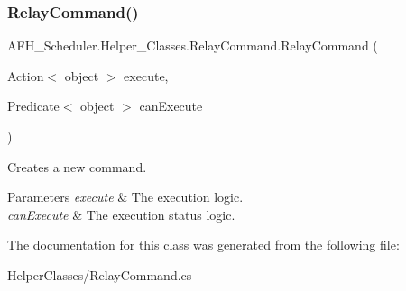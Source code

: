 \subsubsection{RelayCommand()\hspace{0.1cm}{\footnotesize\ttfamily [2/2]}}
{\footnotesize\ttfamily A\+F\+H\+\_\+\+Scheduler.\+Helper\+\_\+\+Classes.\+Relay\+Command.\+Relay\+Command (\begin{DoxyParamCaption}\item[{Action$<$ object $>$}]{execute,  }\item[{Predicate$<$ object $>$}]{can\+Execute }\end{DoxyParamCaption})}



Creates a new command. 


\begin{DoxyParams}{Parameters}
{\em execute} & The execution logic.\\
\hline
{\em can\+Execute} & The execution status logic.\\
\hline
\end{DoxyParams}


The documentation for this class was generated from the following file\+:\begin{DoxyCompactItemize}
\item 
Helper\+Classes/Relay\+Command.\+cs\end{DoxyCompactItemize}
